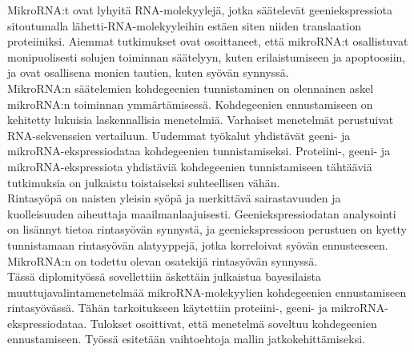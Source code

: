 \documentclass[english,12pt,a4paper,pdftex,elec,utf8]{aaltothesis}
\begin{document}
\newpage

\professorship{--}
\begin{abstractpage}[finnish]

MikroRNA:t ovat lyhyitä RNA-molekyylejä, jotka säätelevät geeniekspressiota
sitoutumalla lähetti-RNA-molekyyleihin estäen siten niiden translaation
proteiiniksi. Aiemmat tutkimukset ovat osoittaneet, että mikroRNA:t
osallistuvat monipuolisesti solujen toiminnan säätelyyn, kuten erilaistumiseen ja
apoptoosiin, ja ovat osallisena monien tautien, kuten syövän synnyssä. \\

MikroRNA:n säätelemien kohdegeenien tunnistaminen on olennainen
askel mikroRNA:n toiminnan ymmärtämisessä. Kohdegeenien
ennustamiseen on kehitetty lukuisia laskennallisia menetelmiä. Varhaiset
menetelmät perustuivat RNA-sekvenssien vertailuun. Uudemmat työkalut
yhdistävät geeni- ja mikroRNA-ekspressiodataa kohdegeenien tunnistamiseksi.
Proteiini-, geeni- ja mikroRNA-ekspressiota yhdistäviä
kohdegeenien tunnistamiseen tähtääviä tutkimuksia on julkaistu toistaiseksi
suhteellisen vähän. \\

Rintasyöpä on naisten yleisin syöpä ja merkittävä sairastavuuden ja
kuolleisuuden aiheuttaja maailmanlaajuisesti. Geeniekspressiodatan analysointi
on lisännyt tietoa rintasyövän synnystä, ja geeniekspressioon perustuen on
kyetty tunnistamaan rintasyövän alatyyppejä, jotka korreloivat syövän
ennusteeseen. MikroRNA:n on todettu olevan osatekijä rintasyövän synnyssä. \\

Tässä diplomityössä sovellettiin äskettäin julkaistua bayesilaista
muuttujavalintamenetelmää mikroRNA-molekyylien kohdegeenien ennustamiseen
rintasyövässä. Tähän tarkoitukseen käytettiin proteiini-, geeni- ja mikroRNA-
ekspressiodataa. Tulokset osoittivat, että menetelmä soveltuu kohdegeenien
ennustamiseen. Työssä esitetään vaihtoehtoja mallin jatkokehittämiseksi.

\end{abstractpage}
\end{document}

